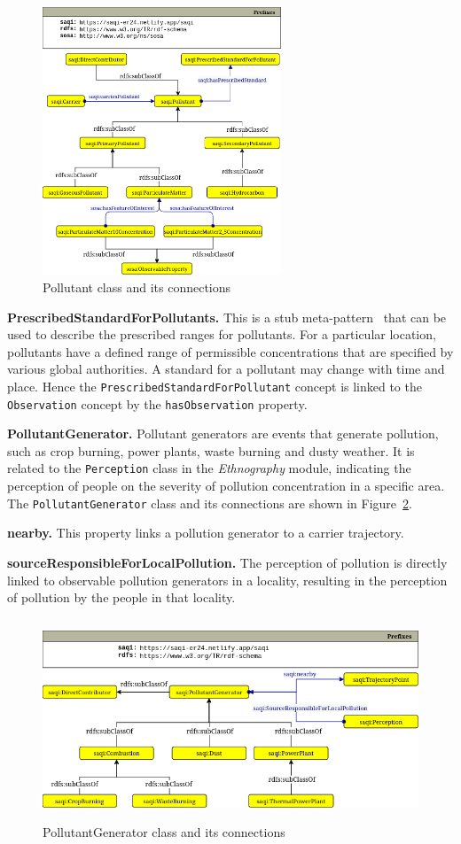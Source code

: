 \begin{figure}[ht]
\centering
\includegraphics[height=8cm]{figures/pollutants_new.png}
\caption{Pollutant class and its connections} 
\label{fig:pollutant_concepts}
\end{figure}
    
\textbf{PrescribedStandardForPollutants.} This is a stub meta-pattern~\cite{stub_MP} that can be used to describe the prescribed ranges for pollutants. For a particular location, pollutants have a defined range of permissible concentrations that are specified by various global authorities. A standard for a pollutant may change with time and place. Hence the \texttt{PrescribedStandardFor\-Pollutant} concept is linked to the \texttt{Observation} concept by the \texttt{has\-Observation} property.

\textbf{PollutantGenerator.} Pollutant generators are events that generate pollution, such as crop burning, power plants, waste burning and dusty weather. It is related to the \texttt{Perception} class in the \emph{Ethnography} module, indicating the  perception of people on the severity of pollution concentration in a specific area. The \texttt{PollutantGenerator} class and its connections are shown in Figure~\ref{fig:pollutant_generator}.

\textbf{nearby.} This property links a pollution generator to a carrier trajectory.

\textbf{sourceResponsibleForLocalPollution.} The perception of pollution is directly linked to observable pollution generators in a locality, resulting in the perception of pollution by the people in that locality.


\begin{figure}[ht]
\centering
\includegraphics[height=6cm]{figures/pollutant_generator_new.png}
\caption{PollutantGenerator class and its connections} 
\label{fig:pollutant_generator}
\end{figure}

